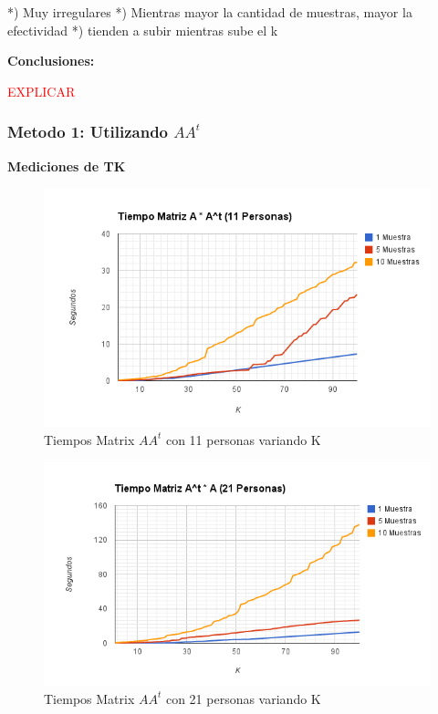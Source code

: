*) Muy irregulares
*) Mientras mayor la cantidad de muestras, mayor la efectividad
*) tienden a subir mientras sube el k

\textbf{Conclusiones:}

\textcolor{red}{EXPLICAR}


\subsubsection{Metodo 1: Utilizando $AA^t$}

\textbf{Mediciones de TK }

\begin{figure}[H]
\includegraphics[width=1\textwidth]{img/imagea.png}
     \caption{Tiempos Matrix $AA^t$ con 11 personas variando K}
\end{figure}

\begin{figure}[H]
\includegraphics[width=1\textwidth]{img/imageb.png}
     \caption{Tiempos Matrix $AA^t$ con 21 personas variando K}
\end{figure}

